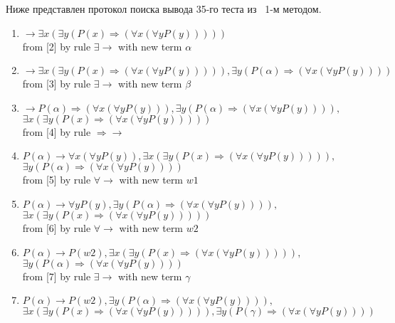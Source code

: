 \documentclass{cw1}
\begin{document}
Ниже представлен протокол поиска вывода 35-го теста из~\cite{tests} 1-м методом.
\begin{enumerate}
\item $ \rightarrow   \exists  x ( \exists  y (P(x)  \Rightarrow  ( \forall  x ( \forall  y P(y)))))$\\
 from [2] by rule $\exists \rightarrow $ with new term $\alpha$
\item $ \rightarrow   \exists  x ( \exists  y (P(x)  \Rightarrow  ( \forall  x ( \forall  y P(y))))),  \exists  y (P(\alpha)  \Rightarrow  ( \forall  x ( \forall  y P(y))))$\\
 from [3] by rule $\exists \rightarrow $ with new term $\beta$
\item $ \rightarrow  P(\alpha)  \Rightarrow  ( \forall  x ( \forall  y P(y))),  \exists  y (P(\alpha)  \Rightarrow  ( \forall  x ( \forall  y P(y)))),$\\$\exists  x ( \exists  y (P(x)  \Rightarrow  ( \forall  x ( \forall  y P(y)))))$\\
 from [4] by rule $ \Rightarrow \rightarrow $
\item $P(\alpha) \rightarrow   \forall  x ( \forall  y P(y)),  \exists  x ( \exists  y (P(x)  \Rightarrow  ( \forall  x ( \forall  y P(y))))),$\\$\exists  y (P(\alpha)  \Rightarrow  ( \forall  x ( \forall  y P(y))))$\\
 from [5] by rule $\forall \rightarrow $ with new term $w1$
\item $P(\alpha) \rightarrow   \forall  y P(y),  \exists  y (P(\alpha)  \Rightarrow  ( \forall  x ( \forall  y P(y)))),$\\$\exists  x ( \exists  y (P(x)  \Rightarrow  ( \forall  x ( \forall  y P(y)))))$\\
 from [6] by rule $\forall \rightarrow $ with new term $w2$
\item $P(\alpha) \rightarrow  P(w2),  \exists  x ( \exists  y (P(x)  \Rightarrow  ( \forall  x ( \forall  y P(y))))),$\\$\exists  y (P(\alpha)  \Rightarrow  ( \forall  x ( \forall  y P(y))))$\\
 from [7] by rule $\exists \rightarrow $ with new term $\gamma$
\item $P(\alpha) \rightarrow  P(w2),  \exists  y (P(\alpha)  \Rightarrow  ( \forall  x ( \forall  y P(y)))),$\\$\exists  x ( \exists  y (P(x)  \Rightarrow  ( \forall  x ( \forall  y P(y))))),  \exists  y (P(\gamma)  \Rightarrow  ( \forall  x ( \forall  y P(y))))$\\

\end{enumerate}
\end{document}
